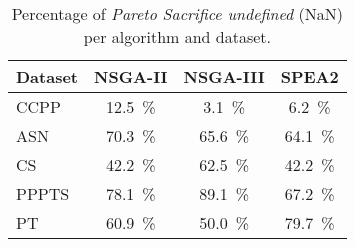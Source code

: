 \begin{table}[ht]
\centering
\caption{Percentage of \textit{Pareto Sacrifice undefined} (NaN) per algorithm and dataset.}
\label{tab:pareto_sacrifice_undefined_nsga-iinsga-iiispea2}
\begin{tabular}{lccc}
\hline
Dataset & NSGA-II & NSGA-III & SPEA2 \\
\hline
CCPP & 12.5~\% & 3.1~\% & 6.2~\% \\
ASN & 70.3~\% & 65.6~\% & 64.1~\% \\
CS & 42.2~\% & 62.5~\% & 42.2~\% \\
PPPTS & 78.1~\% & 89.1~\% & 67.2~\% \\
PT & 60.9~\% & 50.0~\% & 79.7~\% \\
\hline
\end{tabular}
\end{table}